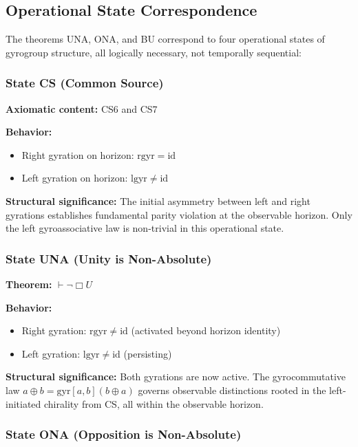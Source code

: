 \documentclass[11pt,a4paper]{article}
\theoremstyle{definition}
\theoremstyle{remark}
\begin{document}
\subsection{Operational State Correspondence}

The theorems UNA, ONA, and BU correspond to four operational states of gyrogroup structure, all logically necessary, not temporally sequential:

\subsubsection{State CS (Common Source)}

\textbf{Axiomatic content:} CS6 and CS7

\textbf{Behavior:}
\begin{itemize}
\item Right gyration on horizon: $\mathrm{rgyr} = \mathrm{id}$
\item Left gyration on horizon: $\mathrm{lgyr} \neq \mathrm{id}$
\end{itemize}

\textbf{Structural significance:} The initial asymmetry between left and right gyrations establishes fundamental parity violation at the observable horizon. Only the left gyroassociative law is non-trivial in this operational state.

\subsubsection{State UNA (Unity is Non-Absolute)}

\textbf{Theorem:} $\vdash \neg\Box U$

\textbf{Behavior:}
\begin{itemize}
\item Right gyration: $\mathrm{rgyr} \neq \mathrm{id}$ (activated beyond horizon identity)
\item Left gyration: $\mathrm{lgyr} \neq \mathrm{id}$ (persisting)
\end{itemize}

\textbf{Structural significance:} Both gyrations are now active. The gyrocommutative law $a \oplus b = \mathrm{gyr}[a,b](b \oplus a)$ governs observable distinctions rooted in the left-initiated chirality from CS, all within the observable horizon.

\subsubsection{State ONA (Opposition is Non-Absolute)}
\end{document}
